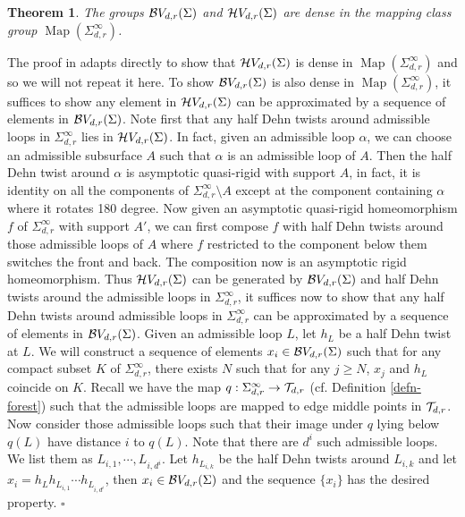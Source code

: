 \documentclass[11pt, a4paper]{amsart}
\newtheorem{thm}{Theorem}[section]
\theoremstyle{definition}
\def\Proof{\noindent{\bf Proof.}\quad}
\def\qed{\hfill$\square$\smallskip}
\DeclareMathOperator{\Map}{Map}
\begin{document}
\begin{thm}\label{thm-dense-asy}
The groups ${\mathcal {B}} V_{d,r}(\Sigma)$ and ${\mathcal {H}} V_{d,r}(\Sigma)$ are dense in the mapping class group $\Map(\Sigma_{d,r}^\infty)$.
\end{thm}
\Proof 
The proof in \cite[Section 6]{AF17} adapts directly to show that ${\mathcal {H}} V_{d,r}(\Sigma)$ is dense in $\Map(\Sigma_{d,r}^\infty)$ and so we will not repeat it here. To show ${\mathcal {B}} V_{d,r}(\Sigma)$ is also dense in $\Map(\Sigma_{d,r}^\infty)$, it suffices to show any element in ${\mathcal {H}} V_{d,r}(\Sigma)$ can be approximated by a sequence of elements in ${\mathcal {B}} V_{d,r}(\Sigma)$. Note first that any half Dehn twists around  admissible loops in $\Sigma_{d,r}^\infty$ lies in ${\mathcal {H}} V_{d,r}(\Sigma)$. In fact, given an admissible loop $\alpha$, we can choose an admissible subsurface $A$ such that $\alpha$ is an admissible loop of $A$. Then the half Dehn twist around $\alpha$ is asymptotic quasi-rigid with support $A$, in fact,  it is identity on all the components of $\Sigma_{d,r}^\infty \setminus A$ except at the component containing $\alpha$  where it rotates 180 degree. Now given an asymptotic quasi-rigid homeomorphism $f$ of $\Sigma_{d,r}^\infty$ with support $A'$,  we can first compose $f$ with  half  Dehn twists around  those admissible loops of $A$ where $f$ restricted to the component below them switches the front and back. The composition now is an asymptotic rigid homeomorphism. Thus ${\mathcal {H}} V_{d,r}(\Sigma)$ can be generated by ${\mathcal {B}} V_{d,r}(\Sigma)$ and half Dehn twists around the admissible loops in  $\Sigma_{d,r}^\infty$, it suffices now to show that any half Dehn twists around admissible loops in $\Sigma_{d,r}^\infty$ can be approximated by a sequence of elements in ${\mathcal {B}} V_{d,r}(\Sigma)$. Given an admissible loop $L$, let $h_L$ be a half Dehn twist at $L$. We will construct a sequence of elements $x_i\in {\mathcal {B}} V_{d,r}(\Sigma)$ such that for any compact subset $K$ of $\Sigma_{d,r}^\infty$, there exists $N$ such that for any $j\geq N$, $x_j$ and $h_L$ coincide on $K$. Recall we have the map $q: \Sigma_{d,r}^\infty \to {\mathcal {T}}_{d,r}$ (cf. Definition \ref{defn-forest}) such that the admissible loops are mapped to edge middle points in ${\mathcal {T}}_{d,r}$. Now consider those admissible loops such that their image under $q$ lying below $q(L)$ have distance $i$ to $q(L)$. Note that there are $d^i$ such admissible loops. We list them as $L_{i,1},\cdots, L_{i,d^i}$. Let $h_{L_{i,k}}$ be the half Dehn twists around $L_{i,k}$ and let $x_i =h_L h_{L_{i,1}} \cdots h_{L_{i,d^i}}$, then $x_i\in {\mathcal {B}} V_{d,r}(\Sigma)$ and the sequence $\{x_i\}$ has the desired property. 
\qed
\end{document}
